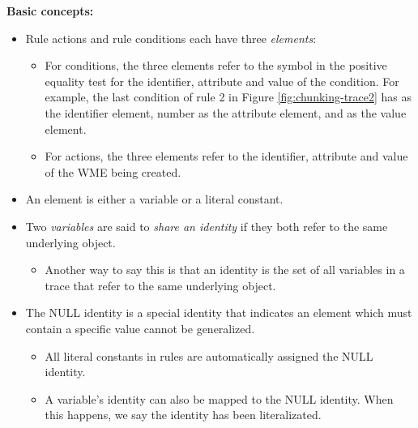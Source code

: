 \textbf{Basic concepts:}

\begin{itemize}
	\item Rule actions and rule conditions each have three \textit{elements}:
	\vspace{-6pt}
	\begin{itemize}
		\item For conditions, the three elements refer to the symbol in the positive equality test for the identifier, attribute and value of the condition.  For example, the last condition of rule 2 in Figure \ref{fig:chunking-trace2} has  as the identifier element, number as the attribute element, and  as the value element.
		\vspace{-6pt}
		\item For actions, the three elements refer to the identifier, attribute and value of the WME being created.
	\end{itemize}
	\vspace{-6pt}
	\item An element is either a variable or a literal constant.
	\vspace{-6pt}
	\item Two \textit{variables} are said to \textit{share an identity} if they both refer to the same underlying object.
	\vspace{-6pt}
	\begin{itemize}
		\item Another way to say this is that an identity is the set of all variables in a trace that refer to the same underlying object.
	\end{itemize}
	\vspace{-6pt}
	\item The NULL identity is a special identity that indicates an element which must contain a specific value cannot be generalized.
	\vspace{-6pt}
	\begin{itemize}
		\item All literal constants in rules are automatically assigned the NULL identity.
		\vspace{-6pt}
		\item A variable's identity can also be mapped to the NULL identity.  When this happens, we say the identity has been literalizated.
	\end{itemize}
	\vspace{-6pt}
\end{itemize}

